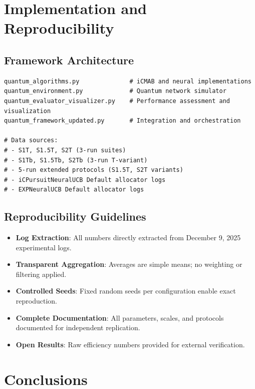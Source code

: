 \documentclass[12pt,a4paper]{article}
\begin{document}
\section{Implementation and Reproducibility}

\subsection{Framework Architecture}
\begin{lstlisting}[caption=Core iCMAB Framework Components]
quantum_algorithms.py              # iCMAB and neural implementations
quantum_environment.py             # Quantum network simulator
quantum_evaluator_visualizer.py    # Performance assessment and visualization
quantum_framework_updated.py       # Integration and orchestration

# Data sources:
# - S1T, S1.5T, S2T (3-run suites)
# - S1Tb, S1.5Tb, S2Tb (3-run T-variant)
# - 5-run extended protocols (S1.5T, S2T variants)
# - iCPursuitNeuralUCB Default allocator logs
# - EXPNeuralUCB Default allocator logs
\end{lstlisting}

\subsection{Reproducibility Guidelines}
\begin{itemize}
\item \textbf{Log Extraction}: All numbers directly extracted from December 9, 2025 experimental logs.
\item \textbf{Transparent Aggregation}: Averages are simple means; no weighting or filtering applied.
\item \textbf{Controlled Seeds}: Fixed random seeds per configuration enable exact reproduction.
\item \textbf{Complete Documentation}: All parameters, scales, and protocols documented for independent replication.
\item \textbf{Open Results}: Raw efficiency numbers provided for external verification.
\end{itemize}

\newpage
\section{Conclusions}
\end{document}
